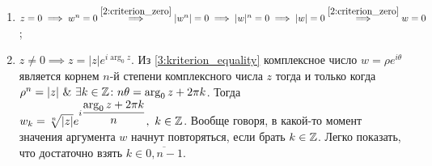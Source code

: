 \begin{enumerate}
\item \(z = 0 \implies w^n = 0 \overset{\ref{2:criterion_zero}}{\implies} |w^n| = 0 \implies |w|^n =
    0 \implies |w| = 0 \overset{\ref{2:criterion_zero}}{\implies} w = 0\);
\item \(z \neq 0 \implies z = |z|e^{i\arg_0{z}}\). Из \ref{3:kriterion_equality} комплексное число
    \(w = \rho e^{i\theta}\) является корнем \(n\)-й степени комплексного числа \(z\) тогда и только
    когда \(\rho^n = |z| \ \& \ \exists k \in \Z \colon n\theta \hm= \arg_0{z} + 2 \pi k\). Тогда
    \(w_k = \sqrt[n]{|z|}e^{i\dfrac{\arg_0{z} + 2 \pi k}{n}}, \ k \in \mathbb{Z}\). Вообще говоря, в какой-то
    момент значения аргумента \(w\) начнут повторяться, если брать \(k \in \mathbb{Z}\). Легко показать, что
    достаточно взять \(k \in \overline{0, n-1}\).
\end{enumerate}

